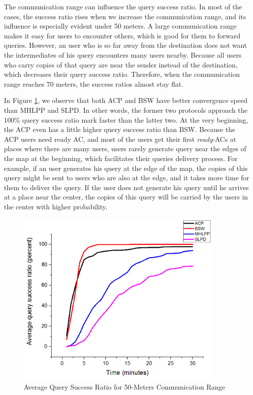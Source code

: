 The communication range can influence the query success ratio. In most of the cases, the success ratio rises when we increase the communication range, and its influence is especially evident under 50 meters. A large communication range makes it easy for users to encounter others, which is good for them to forward queries. However, an user who is so far away from the destination does not want the intermediates of his query encounters many users nearby. Because all users who carry copies of that query are near the sender instead of the destination, which decreases their query success ratio. Therefore, when the communication range reaches 70 meters, the success ratios almost stay flat.

In Figure \ref{fig:F416AverageQuerySuccessRatioWith50MetersCommunicationRatio}, we observe that both ACP and BSW have better convergence speed than MHLPP and SLPD. In other words, the former two protocols approach the 100\% query success ratio mark faster than the latter two. At the very beginning, the ACP even has a little higher query success ratio than BSW. Because the ACP users need ready AC, and most of the users get their first \textit{ready}-ACs at places where there are many users, users rarely generate query near the edges of the map at the beginning, which facilitates their queries delivery process. For example, if an user generates his query at the edge of the map, the copies of this query might be sent to users who are also at the edge, and it takes more time for them to deliver the query. If the user does not generate his query until he arrives at a place near the center, the copies of this query will be carried by the users in the center with higher probability.

\begin{figure} [hbtp]
\centering 
\includegraphics[width=4.0in]{figures/F416AverageQuerySuccessRatioWith50MetersCommunicationRatio.png}
\caption{Average Query Success Ratio for 50-Meters Communication Range} 
\label{fig:F416AverageQuerySuccessRatioWith50MetersCommunicationRatio} %
\end{figure}

